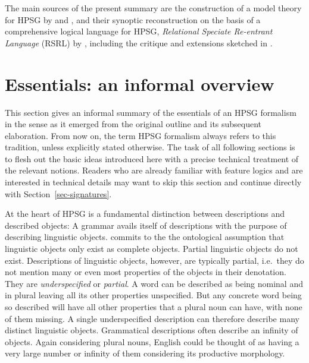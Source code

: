 \documentclass[output=paper
                ,modfonts
                ,nonflat
	        ,collection
	        ,collectionchapter
	        ,collectiontoclongg
 	        ,biblatex
                ,babelshorthands
                ,newtxmath
                ,draftmode
                ,colorlinks, citecolor=brown
]{./langsci/langscibook}
\begin{document}
{%

The main sources of the present summary are the construction of a model
theory for HPSG by \citet{King99a-u} and \citet{Pollard99a}, and their
synoptic reconstruction on the basis of  a comprehensive logical language
for HPSG, \emph{Relational Speciate Re-entrant Language} (RSRL) by
\citet{Richter2004a-u}, including the critique and extensions sketched
in \citet{Richter2007a}.


\section{Essentials: an informal overview}
\label{sec-essentials}


This section gives an informal summary of the essentials of an HPSG
formalism in the sense \cite{PollardSag1994} as it emerged from the
original outline and its subsequent elaboration. From now on, the term
HPSG formalism always refers to this tradition, unless explicitly
stated otherwise.  The task of all following sections is to flesh out
the basic ideas introduced here with a precise technical treatment of
the relevant notions. Readers who are already familiar with feature
logics and are interested in technical details may want to skip this section and
continue directly with Section~\ref{sec-signatures}.

At the heart of HPSG is a fundamental distinction between descriptions
and described objects: A grammar avails itself of descriptions with
the purpose of describing linguistic objects.  \cite{PollardSag1994}
commits to the the ontological assumption that linguistic objects only
exist as complete objects. Partial linguistic objects do not
exist. Descriptions of linguistic objects, however, are typically
partial, i.e.\ they do not mention many or even most properties of the
objects in their denotation. They are \emph{underspecified} or
\emph{partial}. A word can be described as being nominal
and in plural leaving all its other properties unspecified. But any
concrete word being so described will have all other properties that
a plural noun can have, with none of them missing.
A single underspecified description can therefore
describe many distinct linguistic objects. Grammatical descriptions
often describe an infinity of objects. Again considering plural nouns,
English could be thought of as having a very large number or infinity
of them considering its productive morphology.

}
\end{document}
